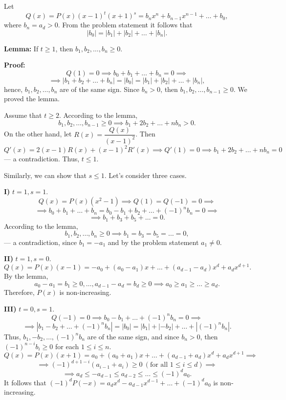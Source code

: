 \documentclass[12pt]{article}
\newcounter{problem}
\begin{document}
Let
\[Q(x) = P(x) (x-1)^t (x+1)^s = b_n x^n + b_{n-1} x^{n-1} + \ldots + b_0,\]
where $b_n = a_d > 0$. From the problem statement it follows that 
\[|b_0| = |b_1| + |b_2| + \ldots + |b_n|.\]

\textbf{Lemma:} If $t \geq 1$, then $b_1, b_2, \ldots, b_n \geq 0$.

\textbf{Proof:} 
\[Q(1) = 0 \implies b_0 + b_1 + \ldots + b_n = 0 \implies\] 
\[\implies |b_1 + b_2 + \ldots + b_n| = |b_0| = |b_1| + |b_2| + \ldots + |b_n|,\]
hence, $b_1, b_2, \ldots, b_n$ are of the same sign. Since $b_n > 0$, then $b_1, b_2, \ldots, b_{n-1} \geq 0$. We proved the lemma.

Assume that $t \geq 2$. According to the lemma,
\[b_1, b_2, \ldots, b_{n-1} \geq 0 \implies b_1 + 2b_2 + \ldots + nb_n > 0.\] 
On the other hand, let $R(x) = \dfrac{Q(x)}{(x - 1)^2}$. Then
\[Q'(x) = 2(x - 1) R(x) + (x - 1)^2 R'(x) \implies Q'(1) = 0 \implies b_1 + 2b_2 + \ldots + nb_n = 0\]
--- a contradiction. Thus, $t \leq 1$.

Similarly, we can show that $s \leq 1$. Let's consider three cases.

\textbf{I)} $t = 1, s = 1$. 
\[Q(x) = P(x) (x^2 - 1) \implies Q(1) = Q(-1) = 0 \implies \]
\[\implies b_0 + b_1 + \ldots + b_n = b_0 - b_1 + b_2 + \ldots + {(-1)^n} b_n = 0 \implies\]
\[\implies b_1 + b_3 + b_5 + \ldots = 0.\]
According to the lemma,
\[b_1, b_2, \ldots, b_n \geq 0 \implies b_1 = b_3 = b_5 = \ldots = 0,\]
--- a contradiction, since $b_1 = -a_1$ and by the problem statement $a_1 \neq 0$. 

\textbf{II)} $t = 1, s = 0$.
\[Q(x) = P(x)(x-1) = -a_0 + (a_0 - a_1 ) x + \ldots + (a_{d-1} - a_d) x^d + a_d x^{d+1}.\]
By the lemma,
\[a_0 - a_1 = b_1 \geq 0, \ldots, a_{d-1} - a_d = b_d \geq 0 \implies a_0 \geq a_1 \geq \ldots \geq a_d.\]
Therefore, $P(x)$ is non-increasing.

\textbf{III)} $t = 0, s = 1$.
\[Q(-1) = 0 \implies b_0 - b_1 + \ldots + (-1)^n b_n = 0 \implies\]
\[\implies |b_1 - b_2 + \ldots + (-1)^n b_n| = |b_0| = |b_1| + |-b_2| + \ldots + |(-1)^n b_n|.\]
Thus, $b_1, -b_2, \ldots, (-1)^n b_n$ are of the same sign, and since $b_n > 0$, then $(-1)^{n-i} b_i \geq 0$ for each $1 \leq i \leq n$. 
\[Q(x) = P(x)(x+1) = a_0 + (a_0 + a_1) x + \ldots + (a_{d-1} + a_d) x^d + a_d x^{d+1} \implies\]
\[\implies (-1)^{d+1-i} (a_{i-1} + a_i) \geq 0 \ (\text{for all } 1 \leq i \leq d) \implies\]
\[\implies a_d \leq -a_{d-1} \leq a_{d-2} \leq \ldots \leq (-1)^d a_0.\]
It follows that $(-1)^d P(-x) = a_d x^d - a_{d-1} x^{d-1} + \ldots + (-1)^d a_0$ is non-increasing.
\end{document}
